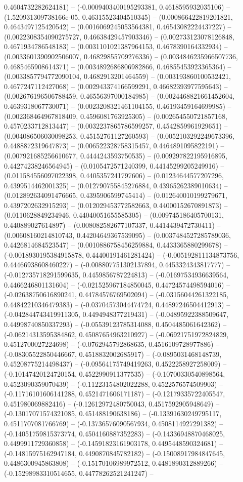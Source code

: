 0.4604732282624181) -- (-0.0009403400195293381, 0.4618595932035106) -- (1.520931309738166e-05, 0.46315523404510345) -- (0.000866422819201821, 0.4643497125420542) -- (0.0016069245053564381, 0.46543082224437227) -- (0.0022308354090275727, 0.46638429457903346) -- (0.002733123078126848, 0.4671934786548183) -- (0.0031101021387964153, 0.4678390164332934) -- (0.0033601390902506007, 0.46829855709276336) -- (0.0034846235966507736, 0.4685465908614371) -- (0.0034892686806982866, 0.46855453923365364) -- (0.0033857794772090104, 0.4682913201464559) -- (0.003193860100532421, 0.4677247112427068) -- (0.002943374166599291, 0.46682393977595643) -- (0.002676196506788459, 0.46556397000184985) -- (0.0024468821661452604, 0.4639318067730071) -- (0.0023208321461104155, 0.46193459164699985) -- (0.002368464967818409, 0.4596081763925305) -- (0.002654550721857168, 0.4570233712813447) -- (0.0032237865786599257, 0.4542859961929651) -- (0.004086506030098253, 0.45152761127260593) -- (0.0052103292249673396, 0.4488872319647873) -- (0.006522328758315457, 0.4464891095822191) -- (0.007921685256610677, 0.4444243593750535) -- (0.009297822195916895, 0.44274238246564945) -- (0.0105472571240399, 0.44145299205249916) -- (0.011584556097022398, 0.4405357241797606) -- (0.01234644577207296, 0.4399514462001325) -- (0.012790755845276884, 0.43965262389010634) -- (0.012892634091476665, 0.4395906599745414) -- (0.012640010199279671, 0.4397202632915293) -- (0.012029453772582663, 0.44000152670891873) -- (0.0110628849234946, 0.44040051655585305) -- (0.009745186405700131, 0.440889027614897) -- (0.008082582677107337, 0.4414439472730411) -- (0.00608160214810743, 0.44204649367539095) -- (0.0037484527285789036, 0.4426814684523547) -- (0.0010886758456259884, 0.4433365880299678) -- (-0.0018930195384915878, 0.44400191461281424) -- (-0.005192811134873756, 0.44466938608460227) -- (-0.008807751302137894, 0.4453324343817777) -- (-0.012735718291599635, 0.4459856787224813) -- (-0.01697534936639564, 0.4466246801131604) -- (-0.021525967184850045, 0.44724574498594016) -- (-0.02638750616890241, 0.44784576769502094) -- (-0.03156044261322185, 0.44842210346479383) -- (-0.03704573044474724, 0.44897246504412913) -- (-0.042844743419911305, 0.4494948377219431) -- (-0.04895922388509647, 0.44998740850337293) -- (-0.05539123785314088, 0.4504485061642362) -- (-0.06214313595384862, 0.45087654963210927) -- (-0.06921751972824829, 0.4512700027224698) -- (-0.0762945792868635, 0.4516109728977886) -- (-0.08305522850446667, 0.4518832002685917) -- (-0.0895031468148739, 0.45208775214498437) -- (-0.09564175749419263, 0.4522258927258009) -- (-0.10147420124720154, 0.4522990911377535) -- (-0.10700330540898564, 0.4523090359070439) -- (-0.11223154802022288, 0.4522576574509903) -- (-0.11716101606141288, 0.4521471606171187) -- (-0.12179335722405547, 0.451980069882416) -- (-0.12612972480750043, 0.4517592905948649) -- (-0.13017071574321085, 0.451488190638186) -- (-0.13391630249795117, 0.4511707081766769) -- (-0.13736576090567934, 0.4508114927291382) -- (-0.14051759815373774, 0.4504160887352283) -- (-0.14336948870468025, 0.4499911729360858) -- (-0.14591823161903178, 0.4495448590324681) -- (-0.14815975162947184, 0.4490870845782182) -- (-0.15008917984847645, 0.4486300945863808) -- (-0.15170106989972512, 0.4481890312889266) -- (-0.15298983310514655, 0.44778262521241247) -- 